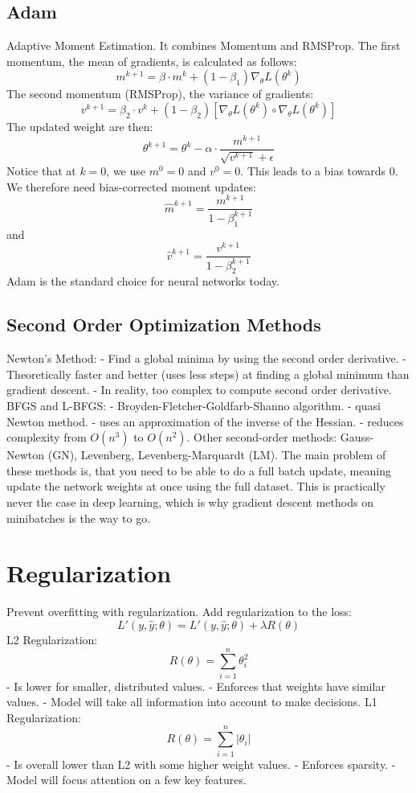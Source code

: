 \documentclass{scrartcl}
\begin{document}
\subsection*{Adam}
Adaptive Moment Estimation.
It combines Momentum and RMSProp.
The first momentum, the mean of gradients, is calculated as follows:
$$m^{k+1} = \beta \cdot m^k + (1 - \beta_1) \nabla_\theta L(\theta^k)$$
The second momentum (RMSProp), the variance of gradients:
$$v^{k+1} = \beta_2 \cdot v^k + (1-\beta_2)[\nabla_\theta L(\theta^k) \circ \nabla_\theta L(\theta^k)]$$
The updated weight are then:
$$\theta^{k+1} = \theta^k - \alpha \cdot \frac{m^{k+1}}{\sqrt{v^{k+1}} + \epsilon}$$
Notice that at $k = 0$, we use $m^0 = 0$ and $v^0 = 0$. This leads to a bias towards 0. We therefore need bias-corrected moment updates:
$$\hat{m}^{k+1} = \frac{m^{k+1}}{1 - \beta_1^{k+1}}$$
and
$$\hat{v}^{k+1} = \frac{v^{k+1}}{1 - \beta_2^{k+1}}$$
Adam is the standard choice for neural networks today.

\subsection*{Second Order Optimization Methods}
Newton's Method:
- Find a global minima by using the second order derivative.
- Theoretically faster and better (uses less steps) at finding a global minimum than gradient descent.
- In reality, too complex to compute second order derivative.
BFGS and L-BFGS:
- Broyden-Fletcher-Goldfarb-Shanno algorithm.
- quasi Newton method.
- uses an approximation of the inverse of the Hessian.
- reduces complexity from $O(n^3)$ to $O(n^2)$.
Other second-order methods: Gauss-Newton (GN), Levenberg, Levenberg-Marquardt (LM).
The main problem of these methods is, that you need to be able to do a full batch update, meaning update the network weights at once using the full dataset. This is practically never the case in deep learning, which is why gradient descent methods on minibatches is the way to go.


\section*{Regularization}
Prevent overfitting with regularization.
Add regularization to the loss:
$$L'(y, \hat{y}; \theta) = L'(y, \hat{y}; \theta) + \lambda R(\theta)$$
L2 Regularization:
$$R(\theta) = \sum_{i=1}^{n} \theta^2_i$$
- Is lower for smaller, distributed values.
- Enforces that weights have similar values.
- Model will take all information into account to make decisions.
L1 Regularization:
$$R(\theta) = \sum_{i=1}^{n} |\theta_i|$$
- Is overall lower than L2 with some higher weight values.
- Enforces sparsity.
- Model will focus attention on a few key features.
\end{document}
